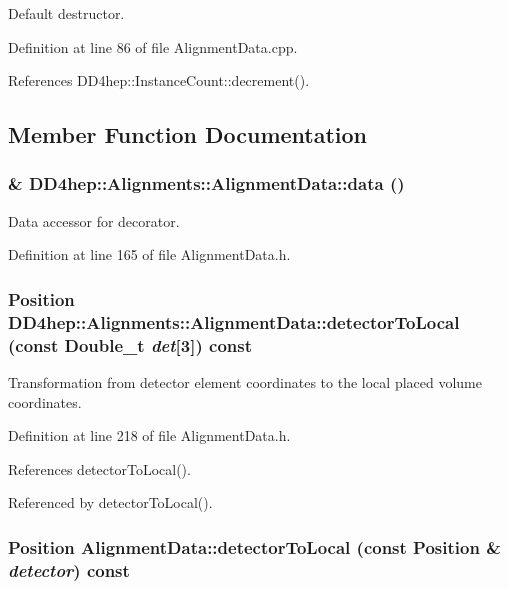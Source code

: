Default destructor. 

Definition at line 86 of file AlignmentData.cpp.

References DD4hep::InstanceCount::decrement().

\subsection{Member Function Documentation}
\hypertarget{class_d_d4hep_1_1_alignments_1_1_alignment_data_a9149a3648883a4d6d941e9b1270599b4}{
\subsubsection[{data}]{\& DD4hep::Alignments::AlignmentData::data ()}}
\label{class_d_d4hep_1_1_alignments_1_1_alignment_data_a9149a3648883a4d6d941e9b1270599b4}


Data accessor for decorator. 

Definition at line 165 of file AlignmentData.h.\hypertarget{class_d_d4hep_1_1_alignments_1_1_alignment_data_aa86d5fc9e8c8046b2d42451f6911794f}{
\subsubsection[{detectorToLocal}]{\setlength{\rightskip}{0pt plus 5cm}Position DD4hep::Alignments::AlignmentData::detectorToLocal (const Double\_\-t {\em det}\mbox{[}3\mbox{]}) const}}
\label{class_d_d4hep_1_1_alignments_1_1_alignment_data_aa86d5fc9e8c8046b2d42451f6911794f}


Transformation from detector element coordinates to the local placed volume coordinates. 

Definition at line 218 of file AlignmentData.h.

References detectorToLocal().

Referenced by detectorToLocal().\hypertarget{class_d_d4hep_1_1_alignments_1_1_alignment_data_aae374197c44e2d8040f3f3f400a95056}{
\subsubsection[{detectorToLocal}]{\setlength{\rightskip}{0pt plus 5cm}Position AlignmentData::detectorToLocal (const Position \& {\em detector}) const}}
\label{class_d_d4hep_1_1_alignments_1_1_alignment_data_aae374197c44e2d8040f3f3f400a95056}


